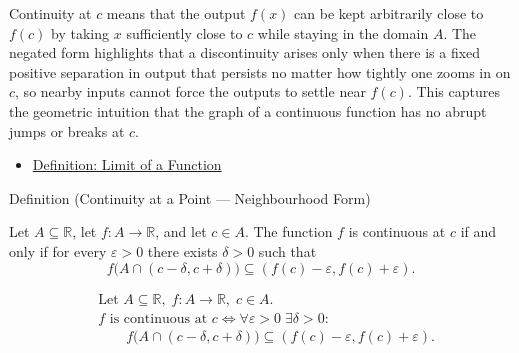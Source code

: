\begin{remark*}[Interpretation]
Continuity at $c$ means that the output $f(x)$ can be kept arbitrarily close to $f(c)$ by taking $x$ sufficiently close to $c$ while staying in the domain $A$. The negated form highlights that a discontinuity arises only when there is a fixed positive separation in output that persists no matter how tightly one zooms in on $c$, so nearby inputs cannot force the outputs to settle near $f(c)$. This captures the geometric intuition that the graph of a continuous function has no abrupt jumps or breaks at $c$.
\end{remark*}

\begin{dependencies}
\begin{itemize}
  \item \hyperref[def:limit-function]{Definition: Limit of a Function}
\end{itemize}
\end{dependencies}


\begin{definitionbox}{Definition (Continuity at a Point --- Neighbourhood Form)}
\begin{definition}
\label{def:continuous-at-point-nbhd}
Let $A \subseteq \mathbb{R}$, let $f : A \to \mathbb{R}$, and let $c \in A$. The function $f$ is continuous at $c$ if and only if for every $\varepsilon > 0$ there exists $\delta > 0$ such that
\[
f\bigl(A \cap (c-\delta, c+\delta)\bigr) \subseteq (f(c)-\varepsilon, f(c)+\varepsilon).
\]
\end{definition}
\end{definitionbox}

\begin{remark*}
\[
\begin{aligned}
&\text{Let } A \subseteq \mathbb{R},\; f:A \to \mathbb{R},\; c \in A.\\
&f \text{ is continuous at } c \Longleftrightarrow \forall \varepsilon > 0\; \exists \delta > 0:\\
&\qquad f\bigl(A \cap (c-\delta, c+\delta)\bigr) \subseteq (f(c)-\varepsilon, f(c)+\varepsilon).
\end{aligned}
\]
\end{remark*}

